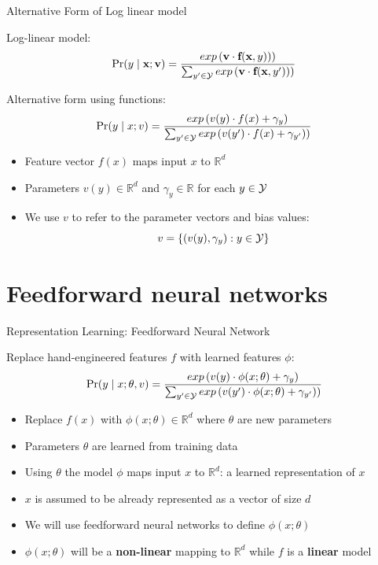 \begin{frame}{Alternative Form of Log linear model}
\begin{block}{Log-linear model:}
\[ \Pr(y \mid \textbf{x}; \textbf{v}) = \frac{exp\left(\textbf{v} \cdot \textbf{f}(\textbf{x}, y))\right)}{\sum_{y' \in {\cal Y}} exp\left(\textbf{v} \cdot \textbf{f}(\textbf{x}, y'))\right)} \]
\end{block}

\begin{block}{Alternative form using functions:}
\[ \Pr(y \mid x; v) = \frac{exp\left(v(y) \cdot f(x) + \gamma_y \right)}{\sum_{y' \in {\cal Y}} exp\left(v(y') \cdot f(x) + \gamma_{y'})\right)} \]
\end{block}

\begin{itemize}[<+->]
\item Feature vector $f(x)$ maps input $x$ to $\mathbb{R}^d$
\item Parameters $v(y) \in \mathbb{R}^d$ and $\gamma_y \in \mathbb{R}$ for each $y \in {\cal Y}$
\item We use $v$ to refer to the parameter vectors and bias values:
\[ v = \{ (v(y), \gamma_y) : y \in {\cal Y} \} \]
\end{itemize}
\end{frame}

\section{Feedforward neural networks}
\frame{\tableofcontents[currentsection]}

\begin{frame}{Representation Learning: Feedforward Neural Network}
\begin{block}{Replace hand-engineered features $f$ with learned features $\phi$:}
\[ \Pr(y \mid x; \theta, v) = \frac{exp\left(v(y) \cdot \phi(x;\theta) + \gamma_y \right)}{\sum_{y' \in {\cal Y}} exp\left(v(y') \cdot \phi(x;\theta) + \gamma_{y'})\right)} \]
\end{block}

\begin{itemize}[<+->]
\item Replace $f(x)$ with $\phi(x;\theta) \in \mathbb{R}^d$ where $\theta$ are new parameters
\item Parameters $\theta$ are learned from training data
\item Using $\theta$ the model $\phi$ maps input $x$ to $\mathbb{R}^d$: a learned representation of $x$
\item $x$ is assumed to be already represented as a vector of size $d$
\item We will use feedforward neural networks to define $\phi(x;\theta)$
\item $\phi(x;\theta)$ will be a \textbf{non-linear} mapping to $\mathbb{R}^d$ while $f$ is a \textbf{linear} model
\end{itemize}
\end{frame}

